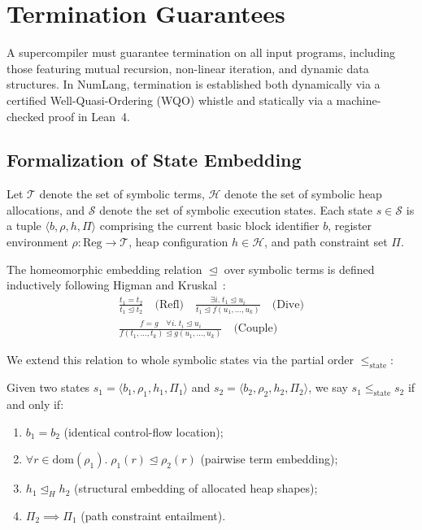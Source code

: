 \section{Termination Guarantees}
\label{sec:termination}

A supercompiler must guarantee termination on all input programs, including those featuring mutual recursion, non-linear iteration, and dynamic data structures. In NumLang, termination is established both dynamically via a certified Well-Quasi-Ordering (WQO) whistle and statically via a machine-checked proof in Lean~4.

\subsection{Formalization of State Embedding}
Let $\mathcal{T}$ denote the set of symbolic terms, $\mathcal{H}$ denote the set of symbolic heap allocations, and $\mathcal{S}$ denote the set of symbolic execution states. Each state $s \in \mathcal{S}$ is a tuple $\langle b, \rho, h, \Pi \rangle$ comprising the current basic block identifier $b$, register environment $\rho: \text{Reg} \to \mathcal{T}$, heap configuration $h \in \mathcal{H}$, and path constraint set $\Pi$.

The homeomorphic embedding relation $\trianglelefteq$ over symbolic terms is defined inductively following Higman and Kruskal~\cite{kruskal1960well}:
\begin{align}
\frac{t_1 = t_2}{t_1 \trianglelefteq t_2} \quad \text{(Refl)} \quad
\frac{\exists i.\; t_1 \trianglelefteq u_i}{t_1 \trianglelefteq f(u_1, \dots, u_k)} \quad \text{(Dive)} \\
\frac{f = g \quad \forall i.\; t_i \trianglelefteq u_i}{f(t_1, \dots, t_k) \trianglelefteq g(u_1, \dots, u_k)} \quad \text{(Couple)}
\end{align}

We extend this relation to whole symbolic states via the partial order $\le_{\text{state}}$:
\begin{definition}
Given two states $s_1 = \langle b_1, \rho_1, h_1, \Pi_1 \rangle$ and $s_2 = \langle b_2, \rho_2, h_2, \Pi_2 \rangle$, we say $s_1 \le_{\text{state}} s_2$ if and only if:
\begin{enumerate}
    \item $b_1 = b_2$ (identical control-flow location);
    \item $\forall r \in \text{dom}(\rho_1).\; \rho_1(r) \trianglelefteq \rho_2(r)$ (pairwise term embedding);
    \item $h_1 \trianglelefteq_H h_2$ (structural embedding of allocated heap shapes);
    \item $\Pi_2 \implies \Pi_1$ (path constraint entailment).
\end{enumerate}
\end{definition}

